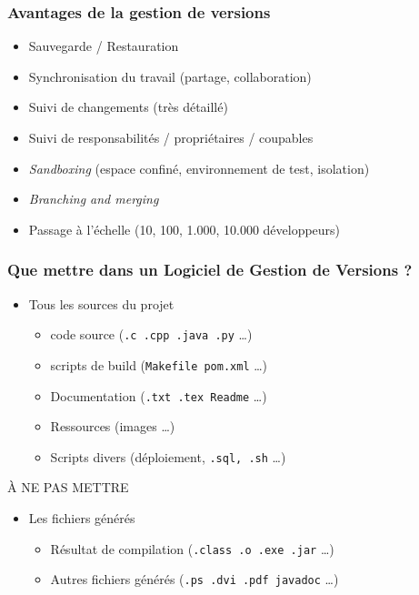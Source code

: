 \documentclass[table,tikz,12pt,svgnames]{beamer}
\begin{document}
\begin{frame}
	\frametitle{Avantages de la gestion de versions}
	\begin{block}{}
    \begin{adjustwidth}{-0.3cm}{-1.4cm}{}
		\begin{itemize}
			\item Sauvegarde / Restauration
			\item Synchronisation du travail (partage, collaboration)
			\item Suivi de changements (très détaillé)
			\item Suivi de responsabilités / propriétaires / coupables
			\item \textit{Sandboxing} (espace confiné, environnement de test, isolation)
			\item \textit{Branching and merging}
			\item Passage à l'échelle (10, 100, 1.000, 10.000 développeurs)
		\end{itemize}
	\end{adjustwidth}
	\end{block}
\end{frame}

\begin{frame}
	\frametitle{Que mettre dans un Logiciel de Gestion de Versions ?}
	\vspace{-2em}
	\begin{block}{}%
    \begin{adjustwidth}{-0.5cm}{}
		\begin{itemize}
			\item Tous les sources du projet
			\begin{itemize}
				\item code source (\texttt{.c .cpp .java .py} \dots)
				\item scripts de build (\texttt{Makefile pom.xml} \ldots)
				\item Documentation (\texttt{.txt .tex Readme} \ldots)
				\item Ressources (images \ldots)
				\item Scripts divers (déploiement, \texttt{.sql, .sh} \ldots)
			\end{itemize}
		\end{itemize}
	\end{adjustwidth}	
	\end{block}
	\PAUSE
	\begin{block}{\color{red} À NE PAS METTRE}
    \begin{adjustwidth}{-0.5cm}{}
	\begin{itemize}
		\item Les fichiers générés
		\begin{itemize}
			\item Résultat de compilation (\texttt{.class .o .exe .jar} \ldots)
			\item Autres fichiers générés (\texttt{.ps .dvi .pdf javadoc} \ldots)
		\end{itemize}
	\end{itemize}
	\end{adjustwidth}
	\end{block}
\end{frame}
\end{document}
